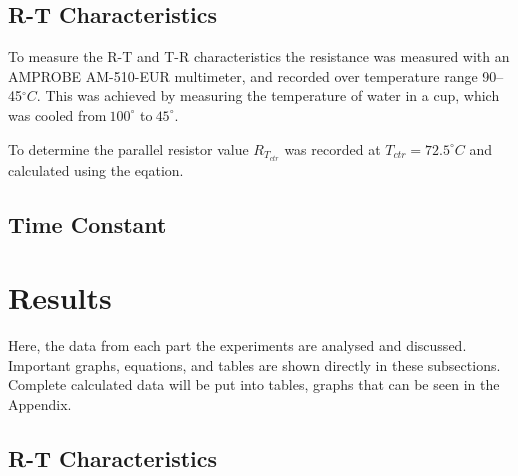 \documentclass[a4,11pt]{article}
\begin{document}
\subsection{R-T Characteristics}

To measure the R-T and T-R characteristics the resistance was measured with an AMPROBE AM-510-EUR multimeter, and recorded over temperature range 90--45$^{\circ}C$. This was achieved by measuring the temperature of water in a cup, which was cooled from$~100^{\circ}$ to$~45^{\circ}$.

To determine the parallel resistor value $R_{T_{ctr}}$ was recorded at $T_{ctr}=72.5^{\circ}C$ and calculated using the eqation.
\subsection{Time Constant}
\section{Results}
Here, the data from each part the experiments are analysed and discussed. Important graphs, equations, and tables are shown directly in these subsections. Complete calculated data will be put into tables, graphs that can be seen in the Appendix.
\subsection{R-T Characteristics}
\end{document}
